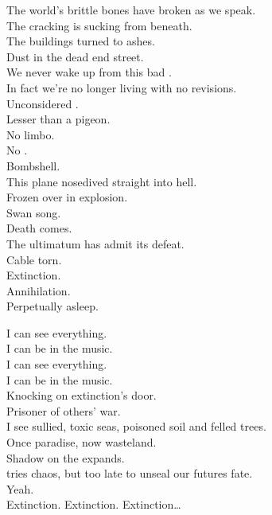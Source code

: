 The world's brittle bones have broken as we speak. \\
The cracking  is sucking from beneath. \\
The buildings turned to ashes. \\
Dust in the dead end street. \\
We never wake up from this bad . \\

In fact we're no longer living with no revisions. \\
Unconsidered . \\
Lesser than a pigeon. \\
No limbo. \\
No . \\
Bombshell. \\
This plane nosedived straight into hell. \\
Frozen over in explosion. \\

Swan song. \\
Death comes. \\
The ultimatum has admit its defeat. \\
Cable torn. \\
Extinction. \\
Annihilation. \\
Perpetually asleep. \\



I can see everything. \\
I can be in the music. \\
I can see everything. \\
I can be in the music. \\

Knocking on extinction's door. \\
Prisoner of others' war. \\
I see sullied, toxic seas, poisoned soil and felled trees. \\
Once paradise, now wasteland. \\
Shadow on the  expands. \\
 tries chaos, but too late to unseal our futures fate. \\
Yeah. \\

Extinction. Extinction. Extinction… \\

